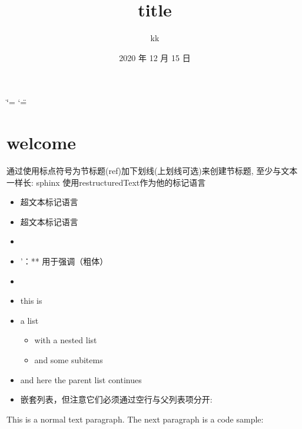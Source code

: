 \documentclass[letterpaper,10pt,english]{sphinxhowto}
\title{title \unexpanded{说明}}
\date{2020 年 12 月 15 日}
\author{kk}
\begin{document}
\ifdefined\shorthandoff
  \ifnum\catcode`\=\string=\active\shorthandoff{=}\fi
  \ifnum\catcode`\"=\active{}\fi
\fi

\pagestyle{empty}
\sphinxmaketitle
\pagestyle{plain}
\sphinxtableofcontents
\pagestyle{normal}
\label{\detokenize{index::doc}}



\section{welcome}
\label{\detokenize{welcome:welcome}}\label{\detokenize{welcome::doc}}
通过使用标点符号为节标题(ref)加下划线(上划线可选)来创建节标题, 至少与文本一样长:
sphinx 使用restructuredText作为他的标记语言
\begin{itemize}
\item {} 
 超文本标记语言

\item {} 
 超文本标记语言

\item {} 
 

\item {} 
’：** 用于强调（粗体）

\item {} 

\end{itemize}
\begin{itemize}
\item {} 
this is

\item {} 
a list
\begin{itemize}
\item {} 
with a nested list

\item {} 
and some subitems

\end{itemize}

\item {} 
and here the parent list continues

\item {} 
嵌套列表，但注意它们必须通过空行与父列表项分开:

\end{itemize}

This is a normal text paragraph. The next paragraph is a code sample:
\end{document}
